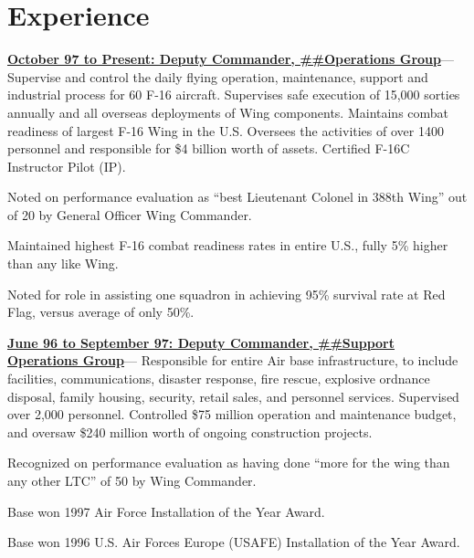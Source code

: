 \documentclass[9pt,letterpaper]{scrartcl}
\newenvironment{accomplishments}{%
	\begin{list}{\textbullet}{%
        \setlength\leftmargin{1em}      %
        \setlength\topsep{0ex}          %
        \setlength\parskip{0.5ex}
        \setstretch{0.8}
        \setlength\listparindent{1em}   %
        \setlength\parsep{0in}          %
        \setlength\itemsep{0.5ex}         %
        }
}{
	\end{list}
}
\newcommand{\accomplishment}{\item }
\newenvironment{job}[4]{%
\vspace{0.0em}
\noindent\textbf{\underline{{#1: #2\ifthenelse{\isempty{#3}}{}{, #3}}}}---#4%
\noindent\begin{accomplishments}{}
}{
\end{accomplishments}
\vspace{1.5em}
}
\begin{document}
\maketitle
\thispagestyle{empty} %

\section*{Experience}

\begin{job}{October 97 to Present}{Deputy Commander, \#\#Operations Group}{USAFB}{%
Supervise and control the daily flying operation,
maintenance, support and industrial process for 60 F-16 aircraft. Supervises safe execution of 15,000 sorties annually and all overseas
deployments of Wing components. Maintains combat readiness of largest F-16 Wing in the U.S. Oversees the activities of over 1400
personnel and responsible for \$4 billion worth of assets. Certified F-16C Instructor Pilot (IP).
}
\accomplishment Noted on performance evaluation as ``best Lieutenant Colonel in 388th Wing'' out of 20 by General Officer Wing Commander.
\accomplishment Maintained highest F-16 combat readiness rates in entire U.S., fully 5\% higher than any like Wing.
\accomplishment Noted for role in assisting one squadron in achieving 95\% survival rate at Red Flag, versus average of only 50\%.
\end{job}

\begin{job}{June 96 to September 97}{Deputy Commander, \#\#Support Operations Group}{USAB}{%
Responsible for entire Air base infrastructure, to include facilities, communications, disaster response, fire rescue, explosive ordnance disposal, family housing,
security, retail sales, and personnel services. Supervised over 2,000 personnel. Controlled \$75 million operation and maintenance
budget, and oversaw \$240 million worth of ongoing construction projects.
}
\accomplishment Recognized on performance evaluation as having done ``more for the wing than any other LTC'' of 50 by Wing Commander.
\accomplishment Base won 1997 Air Force Installation of the Year Award.
\accomplishment Base won 1996 U.S. Air Forces Europe (USAFE) Installation of the Year Award.
\end{job}
\end{document}
